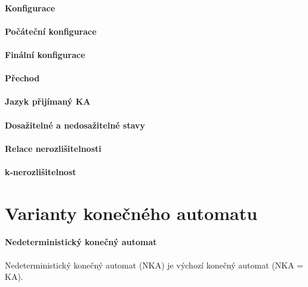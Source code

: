 \paragraph*{Konfigurace} 

\paragraph*{Počáteční konfigurace} 

\paragraph*{Finální konfigurace} 

\paragraph*{Přechod} 

\paragraph*{Jazyk přijímaný KA} 

\paragraph*{Dosažitelné a nedosažitelné stavy} 

\paragraph*{Relace nerozlišitelnosti} 

\paragraph*{k-nerozlišitelnost} 


\section{Varianty konečného automatu}

\paragraph*{Nedeterministický konečný automat} Nedeterministický konečný automat (NKA) je výchozí konečný automat (NKA = KA).

